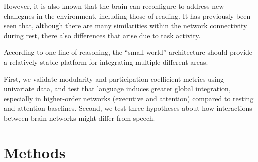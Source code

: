 However, it is also known that the brain can reconfigure to address new challegnes in the environment, including those of reading. It has previously been seen that, although there are many similarities within the network connectivity during rest, there also differences that arise due to task activity. 

According to one line of reasoning, the ``small-world'' architecture should provide a relatively stable platform for integrating multiple different areas. 



First, we validate modularity and participation coefficient metrics using univariate data, and test that language induces greater global integration, especially in higher-order networks (executive and attention) compared to resting and attention baselines. Second, we test three hypotheses about how interactions between brain networks might differ from speech.


\section{Methods}

